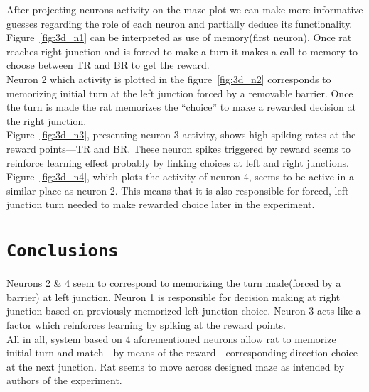 \documentclass[12pt,a4paper,twocolumn]{article}
\begin{document}
After projecting neurons activity on the maze plot we can make more informative guesses regarding the role of each neuron and partially deduce its functionality.\\

Figure~\ref{fig:3d_n1} can be interpreted as use of memory(first neuron). Once rat reaches right junction and is forced to make a turn it makes a call to memory to choose between TR and BR to get the reward.\\

Neuron 2 which activity is plotted in the figure~\ref{fig:3d_n2} corresponds to memorizing initial turn at the left junction forced by a removable barrier. Once the turn is made the rat memorizes the ``choice'' to make a rewarded decision at the right junction.\\

Figure~\ref{fig:3d_n3}, presenting neuron 3 activity, shows high spiking rates at the reward points---TR and BR. These neuron spikes triggered by reward seems to reinforce learning effect probably by linking choices at left and right junctions.\\

Figure~\ref{fig:3d_n4}, which plots the activity of neuron 4, seems to be active in a similar place as neuron 2. This means that it is also responsible for forced, left junction turn needed to make rewarded choice later in the experiment.\\


\section*{\texttt{Conclusions}}
Neurons 2 \& 4 seem to correspond to memorizing the turn made(forced by a barrier) at left junction. Neuron 1 is responsible for decision making at right junction based on previously memorized left junction choice. Neuron 3 acts like a factor which reinforces learning by spiking at the reward points.\\
All in all, system based on 4 aforementioned neurons allow rat to memorize initial turn and match---by means of the reward---corresponding direction choice at the next junction. Rat seems to move across designed maze as intended by authors of the experiment.\\

\end{document}
